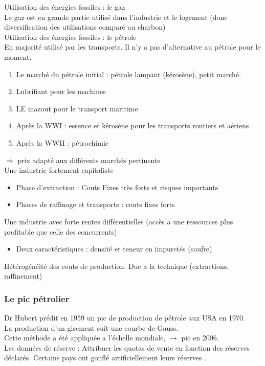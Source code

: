 \documentclass{article}
\begin{document}
Utilisation des énergies fossiles : le gaz \\
Le gaz est en grande partie utilisé dans l'industrie  et le logement (donc diversification des utilisations comparé au charbon) \\

Utilisation des énergies fossiles : le pétrole  \\
En majorité utilisé par les transports. Il n'y a pas d'alternative au pétrole pour le moment.\\

\begin{enumerate}
	\item Le marché du pétrole initial : pétrole lampant (kérosène), petit marché. \\
	\item Lubrifiant pour les machines 
	\item LE mazout pour le transport maritime
	\item Après la WWI : essence et kérosène pour les transports routiers et aériens
	\item Après la WWII : pétrochimie
\end{enumerate}
$\Rightarrow$ prix adapté aux différents marchés pertinents  \\

Une industrie fortement capitaliste
\begin{itemize}
	\item Phase d'extraction : Couts Fixes très forts et risques importants 
	\item Phases de raffinage et transports : couts fixes forts
\end{itemize} 

Une industrie avec forte rentes différentielles  (accès a une ressources plus profitable que celle des concurrents)
\begin{itemize}
	\item Deux caractéristiques : densité et teneur en impuretés (soufre)
\end{itemize}

Hétérogénéité des couts de production. Due a la technique (extractions, raffinement)
\subsubsection{Le pic pétrolier}
Dr Hubert prédit en 1959 un pic de production de pétrole aux USA en 1970. \\
La production d'un gisement suit une courbe de Gauss. \\
Cette méthode a été appliquée a l'échelle mondiale, $\rightarrow$ pic en 2006. \\
Les données de réserve : Attribuer les quotas de vente en fonction des réserves déclarés. Certains pays ont gonflé artificiellement leurs réserves .
\end{document}
